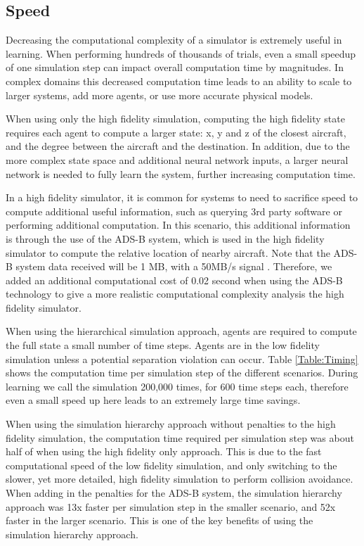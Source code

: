 \documentclass{aamas2014}
\begin{document}
\subsection{Speed}

Decreasing the computational complexity of a simulator is extremely useful in learning. When performing hundreds of thousands of trials, even a small speedup of one simulation step can impact overall computation time by magnitudes. In complex domains this decreased computation time leads to an ability to scale to larger systems, add more agents, or use more accurate physical models. 

When using only the high fidelity simulation, computing the high fidelity state requires each agent to compute a larger state: x, y and z of the closest aircraft, and the degree between the aircraft and the destination. In addition, due to the more complex state space and additional neural network inputs, a larger neural network is needed to fully learn the system, further increasing computation time. 

In a high fidelity simulator, it is common for systems to need to sacrifice speed to compute additional useful information, such as querying 3rd party software or performing additional computation. In this scenario, this additional information is through the use of the ADS-B system, which is used in the high fidelity simulator to compute the relative location of nearby aircraft. Note that the ADS-B system data received will be 1 MB, with a 50MB/s signal \cite{ads-b}. Therefore, we added an additional computational cost of 0.02 second when using the ADS-B technology to give a more realistic computational complexity analysis the high fidelity simulator.

When using the hierarchical simulation approach, agents are required to compute the full state a small number of time steps. Agents are in the low fidelity simulation unless a potential separation violation can occur. Table \ref{Table:Timing} shows the computation time per simulation step of the different scenarios. During learning we call the simulation 200,000 times, for 600 time steps each, therefore even a small speed up here leads to an extremely large time savings. 

When using the simulation hierarchy approach without penalties to the high fidelity simulation, the computation time required per simulation step was about half of when using the high fidelity only approach. This is due to the fast computational speed of the low fidelity simulation, and only switching to the slower, yet more detailed, high fidelity simulation to perform collision avoidance. When adding in the penalties for the ADS-B system, the simulation hierarchy approach was 13x faster per simulation step in the smaller scenario, and 52x faster in the larger scenario. This is one of the key benefits of using the simulation hierarchy approach. 
\end{document}
